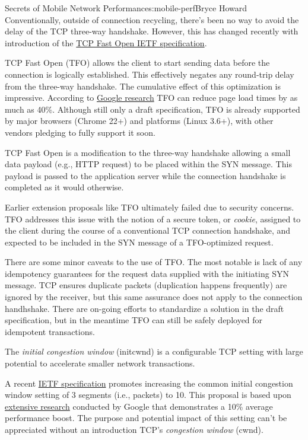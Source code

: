 \begin{aosachapter}{Secrets of Mobile Network Performance}{s:mobile-perf}{Bryce Howard}
Conventionally, outside of connection recycling, there's been no way to
avoid the delay of the TCP three-way handshake. However, this has
changed recently with introduction of the
\href{http://datatracker.ietf.org/doc/draft-ietf-tcpm-fastopen}{TCP Fast
Open IETF specification}.

TCP Fast Open (TFO) allows the client to start sending data before the
connection is logically established. This effectively negates any
round-trip delay from the three-way handshake. The cumulative effect of
this optimization is impressive. According to
\href{http://research.google.com/pubs/pub36640.html}{Google research}
TFO can reduce page load times by as much as 40\%. Although still only a
draft specification, TFO is already supported by major browsers (Chrome
22+) and platforms (Linux 3.6+), with other vendors pledging to fully
support it soon.

TCP Fast Open is a modification to the three-way handshake allowing a
small data payload (e.g., HTTP request) to be placed within the SYN
message. This payload is passed to the application server while the
connection handshake is completed as it would otherwise.

Earlier extension proposals like TFO ultimately failed due to security
concerns. TFO addresses this issue with the notion of a secure token, or
\emph{cookie}, assigned to the client during the course of a
conventional TCP connection handshake, and expected to be included in
the SYN message of a TFO-optimized request.

There are some minor caveats to the use of TFO. The most notable is lack
of any idempotency guarantees for the request data supplied with the
initiating SYN message. TCP ensures duplicate packets (duplication
happens frequently) are ignored by the receiver, but this same assurance
does not apply to the connection handhshake. There are on-going efforts
to standardize a solution in the draft specification, but in the
meantime TFO can still be safely deployed for idempotent transactions.


The \emph{initial congestion window} (initcwnd) is a configurable TCP
setting with large potential to accelerate smaller network transactions.

A recent \href{http://datatracker.ietf.org/doc/rfc6928}{IETF
specification} promotes increasing the common initial congestion window
setting of 3 segments (i.e., packets) to 10. This proposal is based upon
\href{http://research.google.com/pubs/pub36640.html}{extensive research}
conducted by Google that demonstrates a 10\% average performance boost.
The purpose and potential impact of this setting can't be appreciated
without an introduction TCP's \emph{congestion window} (cwnd).


\end{aosachapter}
